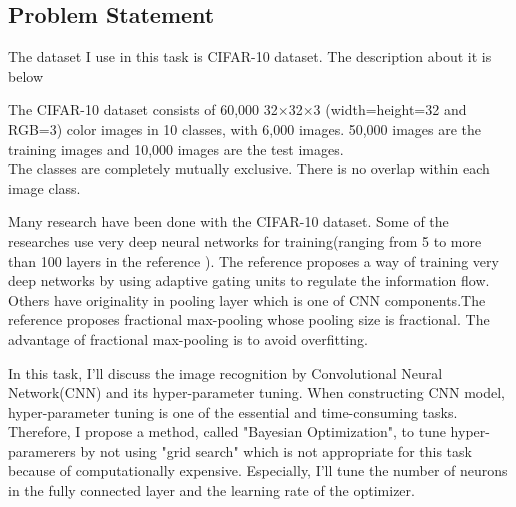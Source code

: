 \subsection{Problem Statement}


The dataset I use in this task is CIFAR-10 dataset. The description about it is below


The CIFAR-10 dataset consists of 60,000 32$\times$32$\times$3 (width=height=32 and RGB=3) color images in 10 classes, with 6,000 images. 50,000 images are the training images and 10,000 images are the test images.\\
The classes are completely mutually exclusive. There is no overlap within each image class.



Many research have been done with the CIFAR-10 dataset. Some of the researches use very deep neural networks for training(ranging from 5 to more than 100 layers in the reference \cite{Very deep}). The reference proposes a way of training very deep networks by using adaptive gating units to regulate the information flow. Others have originality in pooling layer which is one of CNN components.The reference \cite{Fractional} proposes fractional max-pooling whose pooling size is fractional. The advantage of fractional max-pooling is to avoid overfitting.



In this task, I'll discuss the image recognition by Convolutional Neural Network(CNN) and its hyper-parameter tuning. When constructing CNN model, hyper-parameter tuning is one of the essential and time-consuming tasks. Therefore, I propose a method, called "Bayesian Optimization", to tune hyper-paramerers by not using "grid search" which is not appropriate for this task because of computationally expensive. Especially, I'll tune the number of neurons in the fully connected layer and the learning rate of the optimizer.